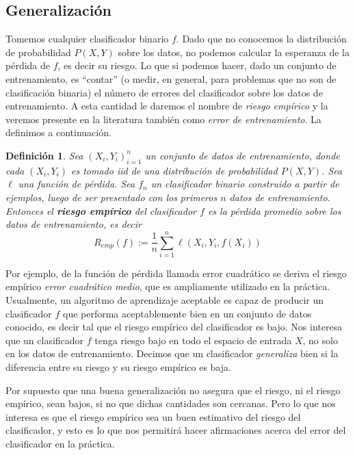 \documentclass{report}
\newtheorem{dfn}{Definición}[section]
\begin{document}
\subsection{Generalización}

Tomemos cualquier clasificador binario $f$. Dado que no conocemos la distribución de probabilidad $P(X,Y)$ sobre los datos, no podemos calcular 
la esperanza de la pérdida de $f$, es decir su riesgo. Lo que si podemos hacer, dado un conjunto de entrenamiento, es ``contar'' (o medir, en general, para problemas
que no son de clasificación binaria) el número de errores del clasificador sobre los datos de entrenamiento. A esta cantidad le daremos
el nombre de \textit{riesgo empírico} y la veremos presente en la literatura también como \textit{error de entrenamiento}. La definimos a continuación.\newline

\begin{dfn} \label{dfn:riesgo_empirico}
    Sea $(X_i,Y_i)_{i=1}^n$ un conjunto de datos de entrenamiento, donde cada $(X_i,Y_i)$ es tomado iid de una distribución de probabilidad $P(X,Y)$. Sea
    $\ell$ una función de pérdida. Sea $f_n$ un clasificador binario construido a partir de ejemplos, luego
    de ser presentado con los primeros $n$ datos de entrenamiento.
    Entonces el \textbf{riesgo empírico} del clasificador $f$ es la pérdida promedio sobre los datos de entrenamiento, es decir
    \[
    R_{emp}(f) := \frac{1}{n} \sum_{i=1}^n \ell(X_i,Y_i,f(X_i))
    \]
\end{dfn}

Por ejemplo, de la función de pérdida llamada error cuadrático se deriva el riesgo empírico \textit{error cuadrático medio}, que es ampliamente
utilizado en la práctica. Usualmente, un algoritmo de aprendizaje aceptable es capaz de producir un clasificador $f$ que performa aceptablemente bien en un conjunto de datos
conocido, es decir tal que el riesgo empírico del clasificador es bajo. Nos interesa que un clasificador $f$ tenga riesgo bajo en todo el espacio
de entrada $X$, no solo en los datos de entrenamiento. Decimos que un clasificador \textit{generaliza} bien si la diferencia entre su riesgo
y su riesgo empírico es baja.\newline

Por supuesto que una buena generalización no asegura que el riesgo, ni el riesgo empírico, sean bajos, si no que dichas cantidades son cercanas.
Pero lo que nos interesa es que el riesgo empírico sea un buen estimativo del riesgo del clasificador, y esto es lo que nos permitirá
hacer afirmaciones acerca del error del clasificador en la práctica.
\end{document}
